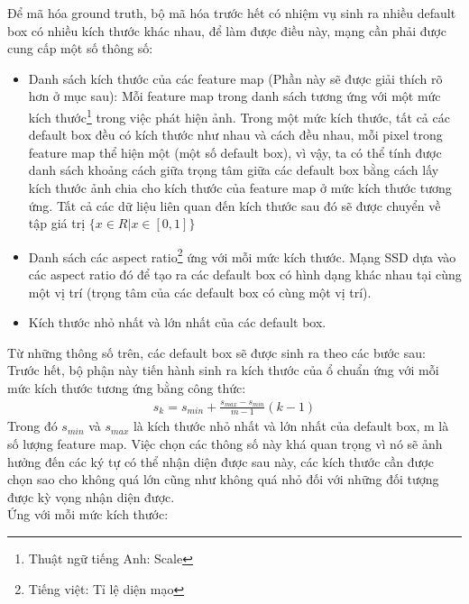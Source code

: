 \documentclass[a4paper]{article}
\theoremstyle{definition}
\begin{document}
	Để mã hóa ground truth, bộ mã hóa trước hết có nhiệm vụ sinh ra nhiều default box có nhiều kích thước khác nhau, để làm được điều này, mạng cần phải được cung cấp một số thông số:\\
	\begin{itemize}
		\item Danh sách kích thước của các feature map (Phần này sẽ được giải thích rõ hơn ở mục sau): Mỗi feature map trong danh sách tương ứng với một mức kích thước\footnote{Thuật ngữ tiếng Anh: Scale} trong việc phát hiện ảnh. Trong một mức kích thước, tất cả các default box đều có kích thước như nhau và cách đều nhau, mỗi pixel trong feature map thể hiện một (một số default box), vì vậy, ta có thể tính được danh sách khoảng cách giữa trọng tâm giữa các default box bằng cách lấy kích thước ảnh chia cho kích thước của feature map ở mức kích thước tương ứng. Tất cả các dữ liệu liên quan đến kích thước sau đó sẽ được chuyển về tập giá trị $\{x \in R | x \in [0, 1] \} $ 
		\item Danh sách các aspect ratio\footnote{Tiếng việt: Tỉ lệ diện mạo} ứng với mỗi mức kích thước. Mạng SSD dựa vào các aspect ratio đó để tạo ra các default box có hình dạng khác nhau tại cùng một vị trí (trọng tâm của các default box có cùng một vị trí).
		\item Kích thước nhỏ nhất và lớn nhất của các default box.
	\end{itemize} 
	
	Từ những thông số trên, các default box sẽ được sinh ra theo các bước sau: \\
	Trước hết, bộ phận này tiến hành sinh ra kích thước của ổ chuẩn ứng với mỗi mức kích thước tương ứng bằng công thức: 
	\begin{align}
	s_k = s_{min} + \frac{s_{max} - s_{min}}{m - 1}(k - 1) 
	\end{align}
	Trong đó $s_{min}$ và $s_{max}$ là kích thước nhỏ nhất và lớn nhất của default box, m là số lượng feature map. Việc chọn các thông số này khá quan trọng vì nó sẽ ảnh hưởng đến các ký tự có thể nhận diện được sau này, các kích thước cần được chọn sao cho không quá lớn cũng như không quá nhỏ đối với những đối tượng được kỳ vọng nhận diện được.\\
	
	Ứng với mỗi mức kích thước:
	
\end{document}
